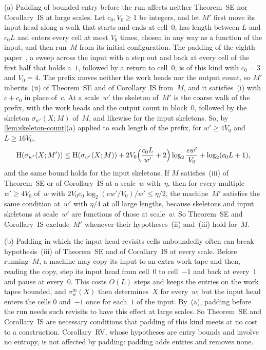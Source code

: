 \begin{remark}[Padding]\label{rem:skel-padding}
(a) Padding of bounded entry before the run affects neither Theorem~SE nor Corollary~IS at large scales. Let
$c_0,V_0\ge1$ be integers, and let $M'$ first move its input head along a walk that starts and ends at cell~$0$, has
length between $L$ and $c_0L$ and enters every cell at most $V_0$ times, chosen in any way as a function of the input,
and then run~$M$ from its initial configuration. The padding of the eighth paper~\cite[Section~6.2]{BoundedNesting2026},
a sweep across the input with a step out and back at every cell of the first half that holds a~$1$, followed by a
return to cell~$0$, is of this kind with $c_0=3$ and $V_0=4$. The prefix moves neither the work heads nor the output
count, so $M'$ inherits~(ii) of Theorem~SE and of Corollary~IS from~$M$, and it satisfies~(i) with $c+c_0$ in place
of~$c$. At a scale~$w'$ the skeleton of~$M'$ is the coarse walk of the prefix, with the work heads and the output count
in block~$0$, followed by the skeleton $\sigma_{w'}(X;M)$ of~$M$, and likewise for the input skeletons. So, by
\cref{lem:skeleton-count}(a) applied to each length of the prefix, for $w'\ge4V_0$ and $L\ge16V_0$,
\[
  \mathrm H(\sigma_{w'}(X;M'))\le\mathrm H(\sigma_{w'}(X;M))
  +2V_0\Bigl(\frac{c_0L}{w'}+2\Bigr)\log_2\frac{ew'}{V_0}+\log_2(c_0L+1),
\]
and the same bound holds for the input skeletons. If $M$ satisfies~(iii) of Theorem~SE or of Corollary~IS at a
scale~$w$ with~$\eta$, then for every multiple $w'\ge4V_0$ of~$w$ with $2V_0c_0\log_2(ew'/V_0)/w'\le\eta/2$, the
machine~$M'$ satisfies the same condition at~$w'$ with $\eta/4$ at all large lengths, because skeletons and input
skeletons at scale~$w'$ are functions of those at scale~$w$. So Theorem~SE and Corollary~IS exclude~$M'$ whenever their
hypotheses~(ii) and~(iii) hold for~$M$.

(b) Padding in which the input head revisits cells unboundedly often can break hypothesis~(iii) of Theorem~SE and of
Corollary~IS at every scale. Before running~$M$, a machine may copy its input to an extra work tape and then, reading
the copy, step its input head from cell~$0$ to cell~$-1$ and back at every~$1$ and pause at every~$0$. This costs $O(L)$
steps and keeps the entries on the work tapes bounded, and $\sigma^{\mathrm{in}}_w(X)$ then determines~$X$ for
every~$w$; but the input head enters the cells $0$ and~$-1$ once for each~$1$ of the input. By~(a), padding before the
run needs such revisits to have this effect at large scales. So Theorem~SE and Corollary~IS are necessary conditions
that padding of this kind meets at no cost to a construction. Corollary~RV, whose hypotheses are entry bounds and
involve no entropy, is not affected by padding: padding adds entries and removes none.
\end{remark}

